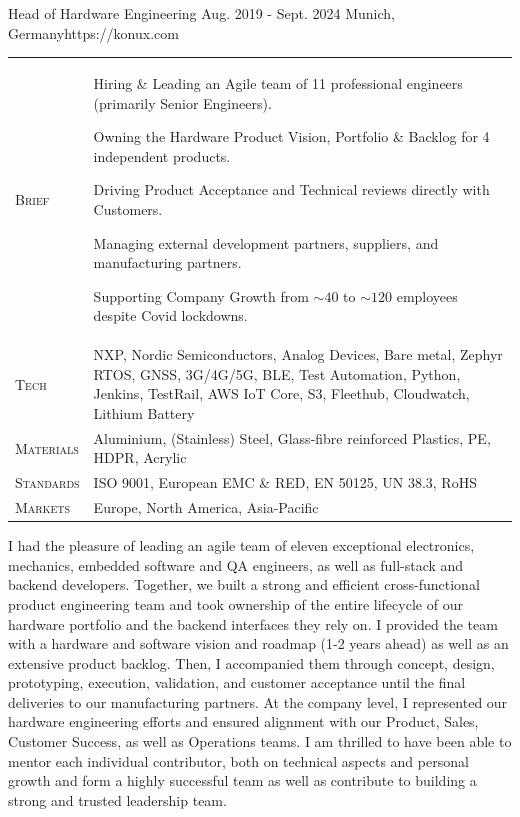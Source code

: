 \documentclass[10pt,a4paper]{moderncv}
\begin{document}
  \vspace{1.5em}

    {Head of Hardware Engineering}
    {Aug. 2019 - Sept. 2024}
    {Munich, Germany}{https://konux.com}

  \begin{tabularx}{\textwidth}{>{\scshape}l@{\hskip 3.5mm}L}
    Brief & Hiring \& Leading an Agile team of 11 professional engineers (primarily Senior Engineers).
    \par Owning the Hardware Product Vision, Portfolio \& Backlog for 4 independent products.
    \par Driving Product Acceptance and Technical reviews directly with Customers.
    \par Managing external development partners, suppliers, and manufacturing partners.
    \par Supporting Company Growth from $\sim 40$ to $\sim 120$ employees despite Covid lockdowns.\\
    Tech & NXP, Nordic Semiconductors, Analog Devices, Bare metal, Zephyr RTOS, GNSS, 3G/4G/5G, BLE, Test Automation, Python, Jenkins, TestRail, AWS IoT Core, S3, Fleethub, Cloudwatch, Lithium Battery\\
    Materials &  Aluminium, (Stainless) Steel, Glass-fibre reinforced Plastics, PE, HDPR, Acrylic\\
    Standards & ISO 9001, European EMC \& RED, EN 50125, UN 38.3, RoHS\\
    Markets & Europe, North America, Asia-Pacific\\
  \end{tabularx}

  \vspace{1.5em}

  \begin{minipage}{\textwidth}
    \small
    I had the pleasure of leading an agile team of eleven exceptional electronics, mechanics, embedded software and QA engineers, as well as full-stack and backend developers. Together, we built a strong and efficient cross-functional product engineering team and took ownership of the entire lifecycle of our hardware portfolio and the backend interfaces they rely on. I provided the team with a hardware and software vision and roadmap (1-2 years ahead) as well as an extensive product backlog. Then, I accompanied them through concept, design, prototyping, execution, validation, and customer acceptance until the final deliveries to our manufacturing partners. At the company level, I represented our hardware engineering efforts and ensured alignment with our Product, Sales, Customer Success, as well as Operations teams. I am thrilled to have been able to mentor each individual contributor, both on technical aspects and personal growth and form a highly successful team as well as contribute to building a strong and trusted leadership team.
  \end{minipage}
  
\end{document}
